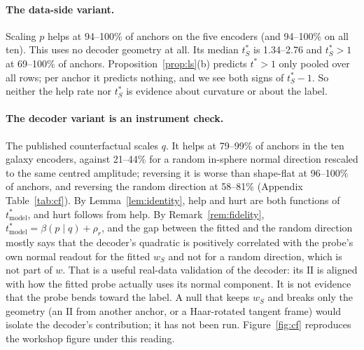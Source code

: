 \documentclass[10pt]{article}
\newcommand{\II}{\mathrm{II}}
\newcommand{\tmodel}{t^*_{\mathrm{model}}}
\begin{document}
\paragraph{The data-side variant.} Scaling $p$ helps at 94--100\% of anchors on the five encoders (and 94--100\% on all ten). %
This uses no decoder geometry at all. Its median $t^*_S$ is 1.34--2.76 and $t^*_S>1$ at 69--100\% of anchors. %
Proposition~\ref{prop:ls}(b) predicts $t^*>1$ only pooled over all rows; per anchor it predicts nothing, and we see both signs of $t^*_S-1$. So neither the help rate nor $t^*_S$ is evidence about curvature or about the label.

\paragraph{The decoder variant is an instrument check.} The published counterfactual scales $q$. It helps at 79--99\% of anchors in the ten galaxy encoders, against 21--44\% for a random in-sphere normal direction rescaled to the same centred amplitude; reversing it is worse than shape-flat at 96--100\% of anchors, and reversing the random direction at 58--81\% (Appendix Table~\ref{tab:cf}). %
By Lemma~\ref{lem:identity}, help and hurt are both functions of $\tmodel$, and hurt follows from help. By Remark~\ref{rem:fidelity}, $\tmodel=\beta(p\mid q)+\rho_r$, and the gap between the fitted and the random direction mostly says that the decoder's quadratic is positively correlated with the probe's own normal readout for the fitted $w_S$ and not for a random direction, which is not part of $w$. That is a useful real-data validation of the decoder: its $\II$ is aligned with how the fitted probe actually uses its normal component. It is not evidence that the probe bends toward the label. A null that keeps $w_S$ and breaks only the geometry (an $\II$ from another anchor, or a Haar-rotated tangent frame) would isolate the decoder's contribution; it has not been run. Figure~\ref{fig:cf} reproduces the workshop figure under this reading.
\end{document}
